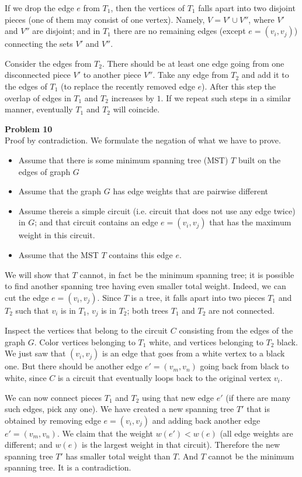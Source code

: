 \documentclass[jou]{apa6}
\begin{document}
If we drop the edge $e$ from $T_1$, then the vertices of $T_1$ falls apart into 
two disjoint pieces (one of them may consist of one vertex). Namely, 
$V = V' \cup V''$, where $V'$ and $V''$ are disjoint; and in $T_1$ there are no 
remaining edges (except $e=(v_i,v_j)$) connecting the sets $V'$ and $V''$. 

Consider the edges from $T_2$. There should be at least one edge going from one 
disconnected piece $V'$ to another piece $V''$. 
Take any edge from $T_2$ and add it to the edges of $T_1$ (to replace the recently removed edge $e$). 
After this step the overlap of edges in $T_1$ and $T_2$ increases by $1$. 
If we repeat such steps in a similar manner, eventually $T_1$ and $T_2$ will coincide.

\vspace{10pt}
{\bf Problem 10}\\
Proof by contradiction. We formulate the negation of what we have to prove. 
\begin{itemize}
\item Assume that there is some minimum spanning tree (MST) $T$ built on 
the edges of graph $G$
\item Assume that the graph $G$ has edge weights that are pairwise different
\item Assume thereis a simple circuit (i.e. circuit that does not use any edge twice) in $G$; 
and that circuit contains an edge $e = (v_i,v_j)$ that has the maximum weight in this circuit. 
\item Assume that the MST $T$ contains this edge $e$.
\end{itemize}

We will show that $T$ cannot, in fact be the minimum spanning tree; it is possible to 
find another spanning tree having even smaller total weight. 
Indeed, we can cut the edge $e = (v_i,v_j)$. Since $T$ is a tree, it falls apart into 
two pieces $T_1$ and $T_2$ such that $v_i$ is in $T_1$, $v_j$ is in $T_2$; both trees
$T_1$ and $T_2$ are not connected. 

Inspect the vertices that belong to the circuit $C$ consisting from the edges of the graph $G$. 
Color vertices belonging to $T_1$ white, and vertices belonging to $T_2$ black. 
We just saw that $(v_i,v_j)$ is an edge that goes from a white vertex to a black one. 
But there should be another edge $e'=(v_m,v_n)$ going back from black to white, since 
$C$ is a circuit that eventually loops back to the original vertex $v_i$. 

We can now connect pieces $T_1$ and $T_2$ using that new edge $e'$ (if there are many such edges, 
pick any one). We have created a new spanning tree $T'$ that is obtained by removing edge
$e=(v_i,v_j)$ and adding back another edge $e'=(v_m,v_n)$.
We claim that the weight $w(e') < w(e)$ (all edge weights are different; and $w(e)$ is the 
largest weight in that circuit). Therefore the new spanning tree $T'$ has smaller total weight than $T$. 
And $T$ cannot be the minimum spanning tree. It is a contradiction.
\end{document}

